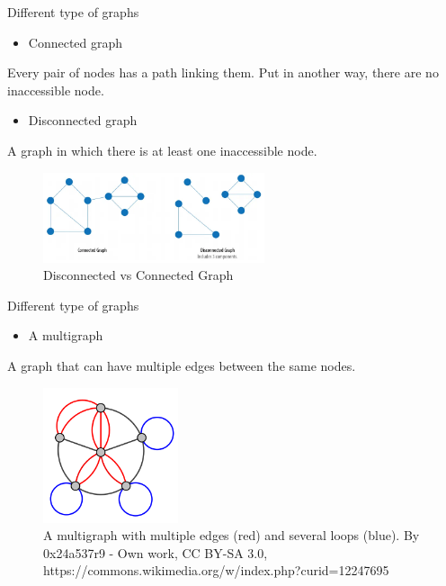 \documentclass[ignorenonframetext,]{beamer}
\providecommand{\tightlist}{%
  \setlength{\itemsep}{0pt}\setlength{\parskip}{0pt}}
\begin{document}
\begin{frame}{Different type of graphs}
\protect\hypertarget{different-type-of-graphs-3}{}

\begin{itemize}
\tightlist
\item
  Connected graph
\end{itemize}

Every pair of nodes has a path linking them. Put in another way, there
are no inaccessible node.

\begin{itemize}
\tightlist
\item
  Disconnected graph
\end{itemize}

A graph in which there is at least one inaccessible node.

\begin{figure}
\centering
\includegraphics[width=\textwidth,height=1.04167in]{disconnected-connected.png}
\caption{Disconnected vs Connected Graph}
\end{figure}

\end{frame}

\begin{frame}{Different type of graphs}
\protect\hypertarget{different-type-of-graphs-4}{}

\begin{itemize}
\tightlist
\item
  A multigraph
\end{itemize}

A graph that can have multiple edges between the same nodes.

\begin{figure}
\centering
\includegraphics[width=\textwidth,height=1.5625in]{Multi-pseudograph.png}
\caption{A multigraph with multiple edges (red) and several loops
(blue). By 0x24a537r9 - Own work, CC BY-SA 3.0,
https://commons.wikimedia.org/w/index.php?curid=12247695}
\end{figure}

\end{frame}
\end{document}
